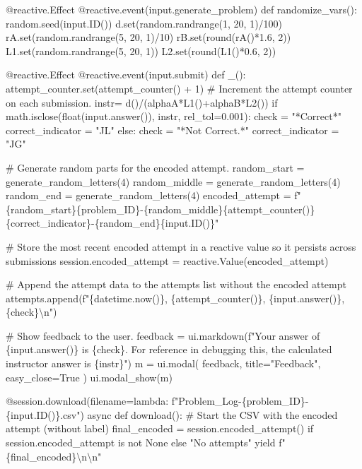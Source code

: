\documentclass[
  letterpaper,
  DIV=11,
  numbers=noendperiod]{scrreprt}
\newenvironment{Shaded}{\begin{snugshade}}{\end{snugshade}}
\newcommand{\NormalTok}[1]{\textcolor[rgb]{0.00,0.23,0.31}{#1}}
\begin{document}
\begin{Shaded}
\begin{Highlighting}[]
\NormalTok{    @reactive.Effect}
\NormalTok{    @reactive.event(input.generate\_problem)}
\NormalTok{    def randomize\_vars():}
\NormalTok{        random.seed(input.ID())}
\NormalTok{        d.set(random.randrange(1, 20, 1)/100)}
\NormalTok{        rA.set(random.randrange(5, 20, 1)/10)}
\NormalTok{        rB.set(round(rA()*1.6, 2))}
\NormalTok{        L1.set(random.randrange(5, 20, 1))}
\NormalTok{        L2.set(round(L1()*0.6, 2))}
        
        
\NormalTok{    @reactive.Effect}
\NormalTok{    @reactive.event(input.submit)}
\NormalTok{    def \_():}
\NormalTok{        attempt\_counter.set(attempt\_counter() + 1)  \# Increment the attempt counter on each submission.}
\NormalTok{        instr= d()/(alphaA*L1()+alphaB*L2())}
\NormalTok{        if math.isclose(float(input.answer()), instr, rel\_tol=0.001):}
\NormalTok{            check = "*Correct*"}
\NormalTok{            correct\_indicator = "JL"}
\NormalTok{        else:}
\NormalTok{            check = "*Not Correct.*"}
\NormalTok{            correct\_indicator = "JG"}

\NormalTok{        \# Generate random parts for the encoded attempt.}
\NormalTok{        random\_start = generate\_random\_letters(4)}
\NormalTok{        random\_middle = generate\_random\_letters(4)}
\NormalTok{        random\_end = generate\_random\_letters(4)}
\NormalTok{        encoded\_attempt = f"\{random\_start\}\{problem\_ID\}{-}\{random\_middle\}\{attempt\_counter()\}\{correct\_indicator\}{-}\{random\_end\}\{input.ID()\}"}

\NormalTok{        \# Store the most recent encoded attempt in a reactive value so it persists across submissions}
\NormalTok{        session.encoded\_attempt = reactive.Value(encoded\_attempt)}

\NormalTok{        \# Append the attempt data to the attempts list without the encoded attempt}
\NormalTok{        attempts.append(f"\{datetime.now()\}, \{attempt\_counter()\}, \{input.answer()\}, \{check\}\textbackslash{}n")}

\NormalTok{        \# Show feedback to the user.}
\NormalTok{        feedback = ui.markdown(f"Your answer of \{input.answer()\} is \{check\}. For reference in debugging this, the calculated instructor answer is \{instr\}")}
\NormalTok{        m = ui.modal(}
\NormalTok{            feedback,}
\NormalTok{            title="Feedback",}
\NormalTok{            easy\_close=True}
\NormalTok{        )}
\NormalTok{        ui.modal\_show(m)}

\NormalTok{    @session.download(filename=lambda: f"Problem\_Log{-}\{problem\_ID\}{-}\{input.ID()\}.csv")}
\NormalTok{    async def download():}
\NormalTok{        \# Start the CSV with the encoded attempt (without label)}
\NormalTok{        final\_encoded = session.encoded\_attempt() if session.encoded\_attempt is not None else "No attempts"}
\NormalTok{        yield f"\{final\_encoded\}\textbackslash{}n\textbackslash{}n"}
        

\end{Highlighting}
\end{Shaded}
\end{document}
